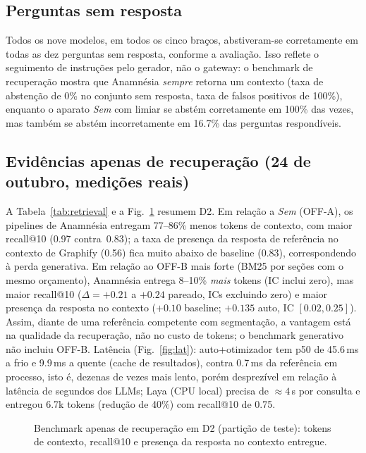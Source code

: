 \documentclass[conference,onecolumn,11pt]{IEEEtran}
\newcommand{\anam}{Anam\-n\'esia}
\begin{document}
\subsection{Perguntas sem resposta}
Todos os nove modelos, em todos os cinco braços, abstiveram-se corretamente em todas as dez perguntas sem resposta, conforme a avaliação. Isso reflete o seguimento de instruções pelo gerador, não o gateway: o benchmark de recuperação mostra que \anam{} \emph{sempre} retorna um contexto (taxa de abstenção de 0\% no conjunto sem resposta, taxa de falsos positivos de 100\%), enquanto o aparato \emph{Sem} com limiar se abstém corretamente em 100\% das vezes, mas também se abstém incorretamente em 16.7\% das perguntas respondíveis.

\subsection{Evidências apenas de recuperação (24 de outubro, medições reais)}
A Tabela~\ref{tab:retrieval} e a Fig.~\ref{fig:retr} resumem D2. Em relação a \emph{Sem} (OFF-A), os pipelines de \anam{} entregam 77--86\% menos tokens de contexto, com maior recall@10 (0.97 contra\ 0.83); a taxa de presença da resposta de referência no contexto de Graphify (0.56) fica muito abaixo de baseline (0.83), correspondendo à perda generativa. Em relação ao OFF-B mais forte (BM25 por seções com o mesmo orçamento), \anam{} entrega 8--10\% \emph{mais} tokens (IC inclui zero), mas maior recall@10 ($\Delta{=}+0.21$ a $+0.24$ pareado, ICs excluindo zero) e maior presença da resposta no contexto ($+0.10$ baseline; $+0.135$ auto, IC $[0.02,0.25]$). Assim, diante de uma referência competente com segmentação, a vantagem está na qualidade da recuperação, não no custo de tokens; o benchmark generativo não incluiu OFF-B. Latência (Fig.~\ref{fig:lat}): auto+otimizador tem p50 de 45.6\,ms a frio e 9.9\,ms a quente (cache de resultados), contra 0.7\,ms da referência em processo, isto é, dezenas de vezes mais lento, porém desprezível em relação à latência de segundos dos LLMs; Laya (CPU local) precisa de $\approx4$\,s por consulta e entregou 6.7k tokens (redução de 40\%) com recall@10 de 0.75.



\begin{figure}[!htbp]\centering
{}
\caption{Benchmark apenas de recuperação em D2 (partição de teste): tokens de contexto, recall@10 e presença da resposta no contexto entregue.}\label{fig:retr}
\end{figure}
\end{document}
